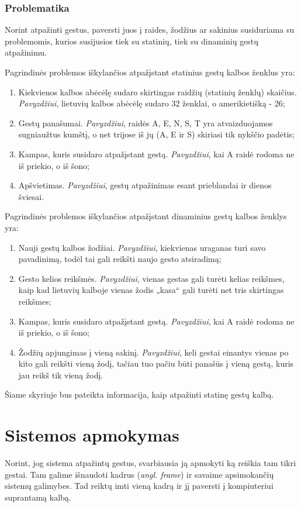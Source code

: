 \documentclass{VUMIFInfKursinis}
\begin{document}
\subsubsection{Problematika}
Norint atpažinti gestus, paversti juos į raides, žodžius ar sakinius susiduriama su problemomis, kurios susijusios tiek su statinių, tiek su dinaminių gestų atpažinimu.


Pagrindinės problemos iškylančios atpažįstant statinius gestų kalbos ženklus yra:
\begin{enumerate}
	\item Kiekvienos kalbos abėcėlę sudaro skirtingas raidžių (statinių ženklų) skaičius. \textit{Pavyzdžiui}, lietuvių kalbos abėcėlę sudaro 32 ženklai, o amerikietišką - 26; 
	\item Gestų panašumai. \textit{Pavyzdžiui}, raidės A, E, N, S, T yra atvaizduojamos sugniaužtus kumštį, o net trijose iš jų (A, E ir S) skiriasi tik nykščio padėtis;
	\item Kampas, kuris susidaro atpažįstant gestą. \textit{Pavyzdžiui}, kai A raidė rodoma ne iš priekio, o iš šono;
	\item Apšvietimas. \textit{Pavyzdžiui}, gestų atpažinimas esant prieblandai ir dienos šviesai.
\end{enumerate}

Pagrindinės problemos iškylančios atpažįstant dinaminius gestų kalbos ženklys yra:
\begin{enumerate}
	\item Nauji gestų kalbos žodžiai. \textit{Pavyzdžiui}, kiekvienas uraganas turi savo pavadinimą, todėl tai gali reikšti naujo gesto atsiradimą; 
	\item Gesto kelios reikšmės. \textit{Pavyzdžiui}, vienas gestas gali turėti kelias reikšmes, kaip kad lietuvių kalboje vienas žodis „kasa“ gali turėti net tris skirtingas reikšmes;
	\item Kampas, kuris susidaro atpažįstant gestą. \textit{Pavyzdžiui}, kai A raidė rodoma ne iš priekio, o iš šono;
	\item Žodžių apjungimas į vieną sakinį. \textit{Pavyzdžiui}, keli gestai einantys vienas po kito gali reikšti vieną žodį, tačiau tuo pačiu būti panašūs į vieną gestą, kuris jau reikš tik vieną žodį.
\end{enumerate}
Šiame skyriuje bus pateikta informacija, kaip atpažinti statinę gestų kalbą.

\section{Sistemos apmokymas}
Norint, jog sistema atpažintų gestus, svarbiausia ją apmokyti ką reiškia tam tikri gestai. Tam galime išnaudoti kadrus (\textit{angl. frame}) ir savaime apsimokančių sistemų galimybes. Tad reiktų imti vieną kadrą ir jį paversti į kompiuteriui suprantamą kalbą. 
\end{document}
